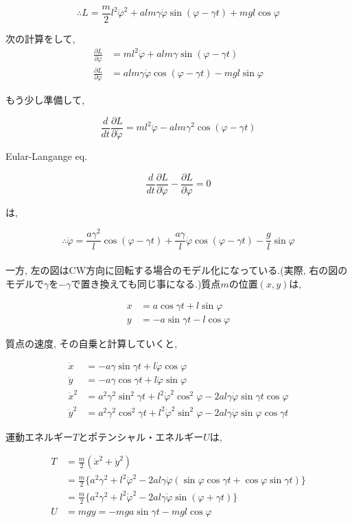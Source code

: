 \[\therefore L=\displaystyle\frac{m}{2}l^2\dot{\varphi}^2 + alm\gamma\dot{\varphi}\sin(\varphi-\gamma t)+mgl\cos\varphi\]

次の計算をして,
\begin{align*}
   \displaystyle\frac{\partial L}{\partial\dot{\varphi}}&=ml^2\dot{\varphi} + alm\gamma\sin(\varphi-\gamma t)\\
   \displaystyle\frac{\partial L}{\partial\varphi}&=alm\gamma\dot{\varphi}\cos(\varphi-\gamma t)- mgl\sin\varphi
\end{align*}

もう少し準備して,

\[\displaystyle\frac{d}{dt}\frac{\partial L}{\partial\dot{\varphi}}=ml^2\ddot{\varphi}-alm\gamma^2\cos(\varphi-\gamma t)\]

Eular-Langange eq.

\[\displaystyle\frac{d}{dt}\frac{\partial L}{\partial\dot{\varphi}}-\frac{\partial L}{\partial\varphi}=0\]

は,

\[\therefore \ddot{\varphi}=\displaystyle\frac{a\gamma^2}{l}\cos(\varphi-\gamma t)+\frac{a\gamma}{l}\dot{\varphi}\cos(\varphi-\gamma t)-\frac{g}{l}\sin\varphi\]\\

一方, 左の図はCW方向に回転する場合のモデル化になっている.(実際, 右の図のモデルで$\gamma$を$-\gamma$で置き換えても同じ事になる.)質点$m$の位置$(x,y)$は,

\begin{align*}
   x&=a\cos\gamma t + l\sin\varphi\\
   y&=-a\sin\gamma t - l\cos\varphi
\end{align*}

質点の速度, その自乗と計算していくと,

\begin{align*}
   \dot{x}&=-a\gamma\sin\gamma t + l\dot{\varphi}\cos\varphi\\
   \dot{y}&=-a\gamma\cos\gamma t + l\dot{\varphi}\sin\varphi\\
   \dot{x}^2&=a^2\gamma^2\sin^2\gamma t + l^2\dot{\varphi}^2\cos^2\varphi - 2al\gamma\dot{\varphi}\sin\gamma t\cos\varphi\\
   \dot{y}^2&=a^2\gamma^2\cos^2\gamma t + l^2\dot{\varphi}^2\sin^2\varphi - 2al\gamma\dot{\varphi}\sin\varphi\cos\gamma t
\end{align*}

運動エネルギー$T$とポテンシャル・エネルギー$U$は,

\begin{align*}
   T&=\displaystyle\frac{m}{2}\left(\dot{x}^2+\dot{y}^2\right)\\
   &=\frac{m}{2}\{a^2\gamma^2 + l^2\dot{\varphi}^2 - 2al\gamma\dot{\varphi}\left(\sin\varphi\cos\gamma t + \cos\varphi\sin\gamma t\right)\}\\
   &=\frac{m}{2}\{a^2\gamma^2 + l^2\dot{\varphi}^2 - 2al\gamma\dot{\varphi}\sin(\varphi+\gamma t)\}\\
   U&=mgy= - mga\sin\gamma t - mgl\cos\varphi
\end{align*}

